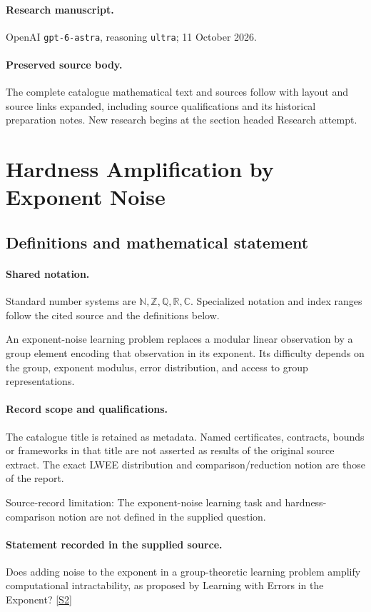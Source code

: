 \documentclass[11pt]{article}
\begin{document}
\paragraph{Research manuscript.} OpenAI \texttt{gpt-6-astra}, reasoning \texttt{ultra}; 11 October 2026.
\paragraph{Preserved source body.} The complete catalogue mathematical text and sources follow with layout and source links expanded, including source qualifications and its historical preparation notes. New research begins at the section headed Research attempt.

\section{Hardness Amplification by Exponent Noise}\label{statement}

\subsection{Definitions and mathematical statement}

\paragraph{Shared notation.}Standard number systems are $\mathbb N,\mathbb Z,\mathbb Q,\mathbb R,\mathbb C$. Specialized notation and index ranges follow the cited source and the definitions below.


An exponent-noise learning problem replaces a modular linear observation by a group element encoding that observation in its exponent. Its difficulty depends on the group, exponent modulus, error distribution, and access to group representations.
\paragraph{Record scope and qualifications.}
The catalogue title is retained as metadata. Named certificates, contracts, bounds or frameworks in that title are not asserted as results of the original source extract.
The exact LWEE distribution and comparison/reduction notion are those of the report.

Source-record limitation: The exponent-noise learning task and hardness-comparison notion are not defined in the supplied question.
\paragraph{Statement recorded in the supplied source.}
Does adding noise to the exponent in a group-theoretic learning problem amplify computational intractability, as proposed by Learning with Errors in the Exponent? \href{https://doi.org/10.4171/owr/2014/35}{[S2]}
\end{document}
